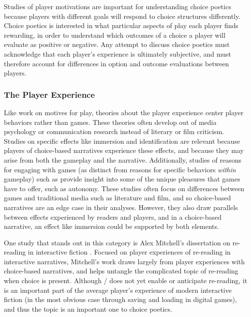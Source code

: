 Studies of player motivations are important for understanding choice poetics because players with different goals will respond to choice structures differently.
%
Choice poetics is interested in what particular aspects of play each player finds rewarding, in order to understand which outcomes of a choice a player will evaluate as positive or negative.
%
Any attempt to discuss choice poetics must acknowledge that each player's experience is ultimately subjective, and must therefore account for differences in option and outcome evaluations between players.

\subsubsection{The Player Experience}

Like work on motives for play, theories about the player experience center player behaviors rather than games.
%
These theories often develop out of media psychology or communication research instead of literary or film criticism.
%
Studies on specific effects like immersion \citep{Douglas2001,Ermi2005} and identification \citep{Klimmt2009} are relevant because players of choice-based narratives experience these effects, and because they may arise from both the gameplay and the narrative.
%
Additionally, studies of reasons for engaging with games (as distinct from reasons for specific behaviors \emph{within} gameplay) such as \citep{Ryan2006,Olson2008} provide insight into some of the unique pleasures that games have to offer, such as autonomy.
%
These studies often focus on differences between games and traditional media such as literature and film, and so choice-based narratives are an edge case in their analyses.
%
However, they also draw parallels between effects experienced by readers and players, and in a choice-based narrative, an effect like immersion could be supported by both elements.


One study that stands out in this category is Alex Mitchell's dissertation on re-reading in interactive fiction \citep{Mitchell2012}.
%
Focused on player experiences of re-reading in interactive narratives, Mitchell's work draws largely from player experiences with choice-based narratives, and helps untangle the complicated topic of re-reading when choice is present.
%
Although \dunyazad/ does not yet enable or anticipate re-reading, it is an important part of the average player's experience of modern interactive fiction (in the most obvious case through saving and loading in digital games), and thus the topic is an important one to choice poetics.

